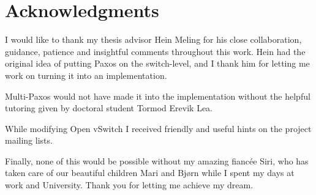 \cleardoublepage%
\chapter*{Acknowledgments}%
\thispagestyle{empty}%

I would like to thank my thesis advisor Hein Meling for his close
collaboration, guidance, patience and insightful comments throughout this
work.
%
Hein had the original idea of putting Paxos on the switch-level, and I thank
him for letting me work on turning it into an implementation.

Multi-Paxos would not have made it into the implementation without the
helpful tutoring given by doctoral student Tormod Erevik Lea.

While modifying Open vSwitch I received friendly and useful hints on the
project mailing lists.

Finally, none of this would be possible without my amazing fiancée Siri, who
has taken care of our beautiful children Mari and Bjørn while I spent my
days at work and University.  Thank you for letting me achieve my dream.
